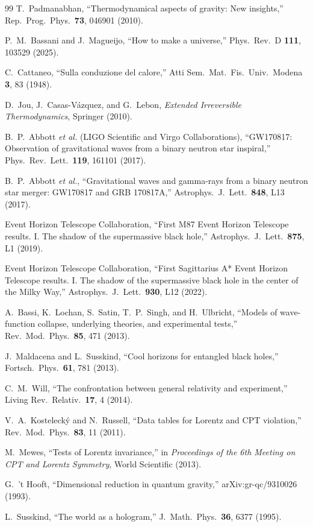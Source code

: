 \documentclass[aps,prd,twocolumn,showpacs,superscriptaddress,preprintnumbers]{revtex4-2}
\begin{document}
\begin{thebibliography}{99}
T.~Padmanabhan,
``Thermodynamical aspects of gravity: New insights,''
Rep.\ Prog.\ Phys.\ \textbf{73}, 046901 (2010).

P.~M.~Bassani and J.~Magueijo,
``How to make a universe,''
Phys.\ Rev.\ D \textbf{111}, 103529 (2025).

C.~Cattaneo,
``Sulla conduzione del calore,''
Atti Sem.\ Mat.\ Fis.\ Univ.\ Modena \textbf{3}, 83 (1948).

D.~Jou, J.~Casas-V{\'a}zquez, and G.~Lebon,
\textit{Extended Irreversible Thermodynamics},
Springer (2010).

B.~P.~Abbott \textit{et al.} (LIGO Scientific and Virgo Collaborations),
``GW170817: Observation of gravitational waves from a binary neutron star inspiral,''
Phys.\ Rev.\ Lett.\ \textbf{119}, 161101 (2017).

B.~P.~Abbott \textit{et al.},
``Gravitational waves and gamma-rays from a binary neutron star merger: GW170817 and GRB 170817A,''
Astrophys.\ J.\ Lett.\ \textbf{848}, L13 (2017).

Event Horizon Telescope Collaboration,
``First M87 Event Horizon Telescope results. I. The shadow of the supermassive black hole,''
Astrophys.\ J.\ Lett.\ \textbf{875}, L1 (2019).

Event Horizon Telescope Collaboration,
``First Sagittarius A* Event Horizon Telescope results. I. The shadow of the supermassive black hole in the center of the Milky Way,''
Astrophys.\ J.\ Lett.\ \textbf{930}, L12 (2022).

A.~Bassi, K.~Lochan, S.~Satin, T.~P.~Singh, and H.~Ulbricht,
``Models of wave-function collapse, underlying theories, and experimental tests,''
Rev.\ Mod.\ Phys.\ \textbf{85}, 471 (2013).

J.~Maldacena and L.~Susskind,
``Cool horizons for entangled black holes,''
Fortsch.\ Phys.\ \textbf{61}, 781 (2013).

C.~M.~Will,
``The confrontation between general relativity and experiment,''
Living Rev.\ Relativ.\ \textbf{17}, 4 (2014).

V.~A.~Kosteleck{\'y} and N.~Russell,
``Data tables for Lorentz and CPT violation,''
Rev.\ Mod.\ Phys.\ \textbf{83}, 11 (2011).

M.~Mewes,
``Tests of Lorentz invariance,''
in \textit{Proceedings of the 6th Meeting on CPT and Lorentz Symmetry},
World Scientific (2013).

G.~'t Hooft,
``Dimensional reduction in quantum gravity,''
arXiv:gr-qc/9310026 (1993).

L.~Susskind,
``The world as a hologram,''
J.\ Math.\ Phys.\ \textbf{36}, 6377 (1995).

\end{thebibliography}
\end{document}
